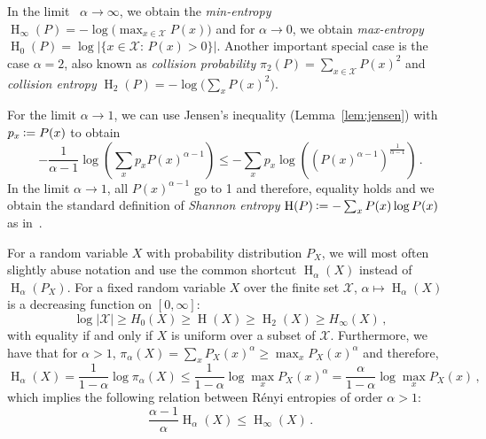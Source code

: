 \documentclass[final,11pt,a4paper]{report}
\newcommand*{\assign}{\ensuremath{\kern.5ex\raisebox{.1ex}{\mbox{\rm:}}\kern -.3em =}}
\newcommand*{\cX}{\mathcal{X}}
\newcommand*{\Set}[2]{\{#1:\,#2\}}     %
\renewcommand*{\H}{\operatorname{H}}   %
\begin{document}
In the limit \ \!$\alpha \rightarrow \infty$, we obtain the {\em
{}min-entropy} $\H_{\infty}(P) = - \log \big(\max_{x \in \cX}
P(x)\big)$ and for $\alpha \rightarrow 0$, we obtain
\emph{max-entropy} $\H_0(P) = \log | \Set{x \in \cX}{P(x)>0} |$.
Another important special case is the case $\alpha = 2$, also known as
{\em {}collision probability} $\pi_2(P)= \sum_{x \in \cX} P(x)^2$ and
\emph{collision entropy} $\H_2(P) = - \log \big(\sum_x P(x)^2\big)$.

For the limit $\alpha \rightarrow 1$, we can use Jensen's inequality
(Lemma~\ref{lem:jensen}) with $p_x \assign P(x)$ to obtain
\[
- \frac{1}{\alpha-1} \log \left(\sum_x p_x P(x)^{\alpha-1} \right) \leq - \sum_x
p_x \log \left( (P(x)^{\alpha-1})^{\frac{1}{\alpha-1}} \right)  \, .
\]
In the limit $\alpha \rightarrow 1$, all $P(x)^{\alpha-1}$ go to 1 and
therefore, equality holds and we obtain the standard definition of
\emph{Shannon entropy} $\H(P) \assign - \sum_x P(x) \log P(x)$ as in~\cite{Shannon48}. 


For a random variable $X$ with probability distribution $P_X$, we will
most often slightly abuse notation and use the common shortcut
$\H_{\alpha}(X)$ instead of $\H_{\alpha}(P_X)$. For a fixed random
variable $X$ over the finite set $\cX$, $\alpha \mapsto \H_\alpha(X)$ is a decreasing
function on $[0,\infty]$:
\[ \log|\cX| \geq H_0(X) \geq \H(X) \geq \H_2(X) \geq H_\infty(X) \, ,
\]
with equality if and only if $X$ is uniform over a subset of
$\cX$. Furthermore, we have that for $\alpha>1$, $\pi_\alpha(X) =
\sum_x P_X(x)^\alpha \geq \max_x P_X(x)^\alpha$ and therefore,
\[ \H_\alpha(X) = \frac{1}{1-\alpha} \log \pi_\alpha(X) \leq
\frac{1}{1-\alpha} \log \max_x P_X(x)^\alpha = \frac{\alpha}{1-\alpha}
\log \max_x P_X(x) \, , 
\]
which implies the following relation between R\'enyi entropies of
order $\alpha>1$:
\begin{equation} \label{eq:renyirelation}
\frac{\alpha-1}{\alpha} \H_\alpha(X) \leq \H_{\infty}(X) \, .
\end{equation}

\end{document}
